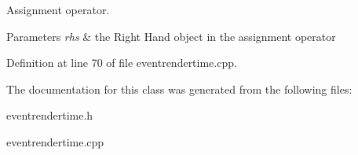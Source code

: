 Assignment operator. 


\begin{DoxyParams}{Parameters}
{\em rhs} & the Right Hand object in the assignment operator \\
\hline
\end{DoxyParams}


Definition at line 70 of file eventrendertime.cpp.



The documentation for this class was generated from the following files:\begin{DoxyCompactItemize}
\item 
eventrendertime.h\item 
eventrendertime.cpp\end{DoxyCompactItemize}
